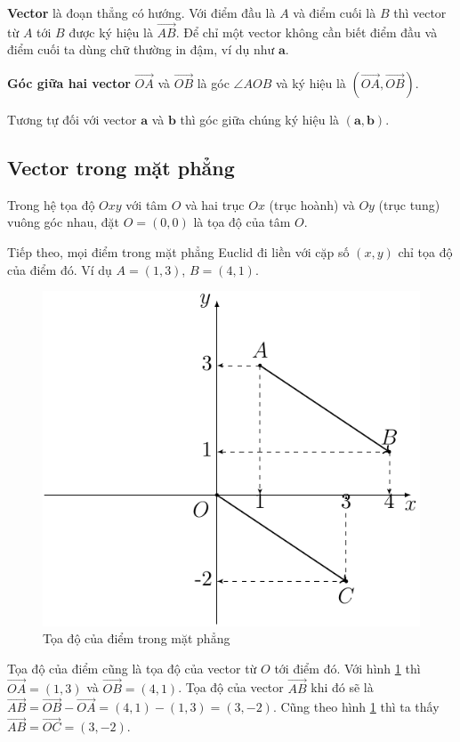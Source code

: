 \textbf{Vector} là đoạn thẳng có hướng. Với điểm đầu là $A$ và điểm cuối là $B$ thì vector từ $A$ tới $B$ được ký hiệu là $\overrightarrow{AB}$. Để chỉ một vector không cần biết điểm đầu và điểm cuối ta dùng chữ thường in đậm, ví dụ như $\bm{a}$.

\textbf{Góc giữa hai vector} $\overrightarrow{OA}$ và $\overrightarrow{OB}$ là góc $\angle AOB$ và ký hiệu là $(\overrightarrow{OA}, \overrightarrow{OB})$.

Tương tự đối với vector $\bm{a}$ và $\bm{b}$ thì góc giữa chúng ký hiệu là $(\bm{a}, \bm{b})$.

\subsection*{Vector trong mặt phẳng}

Trong hệ tọa độ $Oxy$ với tâm $O$ và hai trục $Ox$ (trục hoành) và $Oy$ (trục tung) vuông góc nhau, đặt $O = (0, 0)$ là tọa độ của tâm $O$.

Tiếp theo, mọi điểm trong mặt phẳng Euclid đi liền với cặp số $(x, y)$ chỉ tọa độ của điểm đó. Ví dụ $A = (1, 3)$, $B = (4, 1)$.

\begin{figure}[ht]
	\centering
	\includegraphics[page=1]{analytic_geometry/oxy1.pdf}
	\caption{Tọa độ của điểm trong mặt phẳng}
	\label{oxy1}
\end{figure}

Tọa độ của điểm cũng là tọa độ của vector từ $O$ tới điểm đó. Với hình \ref{oxy1} thì $\overrightarrow{OA} = (1, 3)$ và $\overrightarrow{OB} = (4, 1)$. Tọa độ của vector $\overrightarrow{AB}$ khi đó sẽ là $\overrightarrow{AB} = \overrightarrow{OB} - \overrightarrow{OA} = (4, 1) - (1, 3) = (3, -2)$. Cũng theo hình \ref{oxy1} thì ta thấy $\overrightarrow{AB} = \overrightarrow{OC} = (3, -2)$. 

